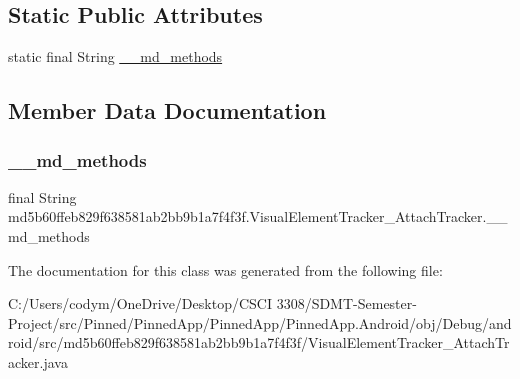 \subsection*{Static Public Attributes}
\begin{DoxyCompactItemize}
\item 
static final String \hyperlink{classmd5b60ffeb829f638581ab2bb9b1a7f4f3f_1_1_visual_element_tracker___attach_tracker_a16358e9d6e1593b6ee783eac6cc7ee81}{\+\_\+\+\_\+md\+\_\+methods}
\end{DoxyCompactItemize}


\subsection{Member Data Documentation}
\mbox{\label{classmd5b60ffeb829f638581ab2bb9b1a7f4f3f_1_1_visual_element_tracker___attach_tracker_a16358e9d6e1593b6ee783eac6cc7ee81}} 
\subsubsection{\texorpdfstring{\+\_\+\+\_\+md\+\_\+methods}{\_\_md\_methods}}
{\footnotesize\ttfamily final String md5b60ffeb829f638581ab2bb9b1a7f4f3f.\+Visual\+Element\+Tracker\+\_\+\+Attach\+Tracker.\+\_\+\+\_\+md\+\_\+methods\hspace{0.3cm}{\ttfamily [static]}}



The documentation for this class was generated from the following file\+:\begin{DoxyCompactItemize}
\item 
C\+:/\+Users/codym/\+One\+Drive/\+Desktop/\+C\+S\+C\+I 3308/\+S\+D\+M\+T-\/\+Semester-\/\+Project/src/\+Pinned/\+Pinned\+App/\+Pinned\+App/\+Pinned\+App.\+Android/obj/\+Debug/android/src/md5b60ffeb829f638581ab2bb9b1a7f4f3f/Visual\+Element\+Tracker\+\_\+\+Attach\+Tracker.\+java\end{DoxyCompactItemize}
